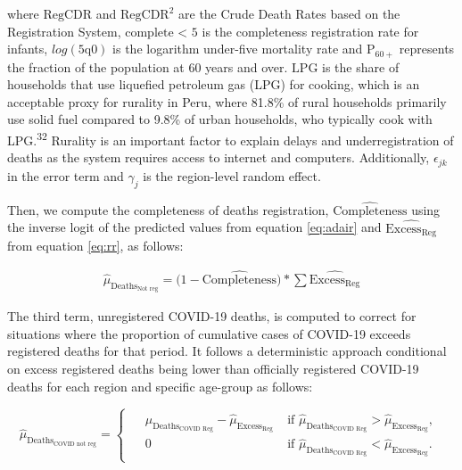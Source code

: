 \documentclass[
]{article}
\begin{document}
where \(\text{RegCDR}\) and \(\text{RegCDR}^2\) are the Crude Death Rates based on the Registration System, \(\text{complete < 5}\) is the completeness registration rate for infants, \(log(\text{5q0})\) is the logarithm under-five mortality rate and \(\text{P}_{60+}\) represents the fraction of the population at 60 years and over. \(\text{LPG}\) is the share of households that use liquefied petroleum gas (LPG) for cooking, which is an acceptable proxy for rurality in Peru, where 81.8\% of rural households primarily use solid fuel compared to 9.8\% of urban households, who typically cook with LPG.\textsuperscript{32} Rurality is an important factor to explain delays and underregistration of deaths as the system requires access to internet and computers. Additionally, \(\epsilon_{jk}\) in the error term and \(\gamma_{j}\) is the region-level random effect.

Then, we compute the completeness of deaths registration, \(\widehat{\text{Completeness}}\) using the inverse logit of the predicted values from equation \eqref{eq:adair} and \(\widehat{{\text{Excess}}_\text{Reg}}\) from equation \eqref{eq:rr}, as follows:

\begin{equation}
\label{eq:unreg}
   \begin{aligned}
  \widehat{\mu}_{\text{Deaths}_\text{Not reg}}= \big(1-\widehat{\text{Completeness}}\big)*
  \sum{\widehat{{\text{Excess}}_\text{Reg}}}
   \end{aligned}      
\end{equation}

The third term, unregistered COVID-19 deaths, is computed to correct for situations where the proportion of cumulative cases of COVID-19 exceeds registered deaths for that period. It follows a deterministic approach conditional on excess registered deaths being lower than officially registered COVID-19 deaths for each region and specific age-group as follows:

\begin{equation}
\label{eq:covidnotreg}
   \widehat{\mu}_{\text{Deaths}_\text{COVID not reg}}=  
   \begin{cases}
    \begin{aligned}
 &  \widehat{\mu}_{\text{Deaths}_\text{COVID Reg}}-\widehat{\mu}_{\text{Excess}_\text{Reg}} \; & \text{if }\widehat{\mu}_{\text{Deaths}_\text{COVID Reg}} > \widehat{\mu}_{\text{Excess}_\text{Reg}},\\[1ex]
& 0 \;& \text{if }\widehat{\mu}_{\text{Deaths}_\text{COVID Reg}} < \widehat{\mu}_{\text{Excess}_\text{Reg}}.
  \end{aligned}
    \end{cases} 
\end{equation}
\end{document}
